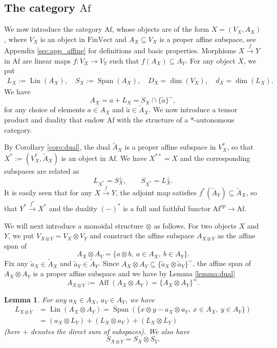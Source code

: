 \documentclass[12pt]{article}
\newtheorem{lemma}{Lemma}
\theoremstyle{definition}
\theoremstyle{remark}
\def\aff{\operatorname{Aff}}
\def\lin{\operatorname{Lin}}
\def\Span{\operatorname{Span}}
\def \Af{\mathrm{Af}}
\def \FV{\mathrm{FinVect}}
\begin{document}
\subsection{The category $\Af$}

We now introduce the category $\Af$, whose objects  are of the form $X=(V_X,A_X)$, where
$V_X$ is an object in $\FV$  and $A_X\subseteq V_X$ is a proper affine subspace, see Appendix
\ref{sec:app_affine} for definitions and basic properties. Morphisms $X\xrightarrow{f} Y$ in $\Af$ are linear maps $f:V_X\to V_Y$  such that
$f(A_X)\subseteq A_Y$. For any object $X$, we put
\begin{align*}
L_X:=\lin(A_X), \quad  S_X:=\Span(A_X), \quad D_X=\dim(V_X),\quad d_X=\dim(L_X).
\end{align*}
We have
\begin{equation}\label{eq:ALS}
A_X=a+L_X=S_X\cap \{\tilde a\}^{\sim},
\end{equation}
for any choice of elements $a\in A_X$ and $\tilde a\in \tilde A_X$.
We now introduce a tensor product  and duality that endow $\Af$ with the structure of a
*-autonomous category.


By Corollary \ref{coro:dual},  the dual $\tilde A_X$ is a proper affine subspace in $V_X^*$, so that
$X^*:=(V_X^*,\tilde A_X)$ is an object in $\Af$. We have $X^{**}=X$ and the corresponding subspaces
are related as
\begin{equation}\label{eq:duality}
L_{X^*}=S_X^\perp,\qquad S_{X^*}=L_X^\perp.
\end{equation}
It is easily seen that for any  $X\xrightarrow{f} Y$, the adjoint map satisfies $f^*(\tilde
A_Y)\subseteq \tilde A_X$, so that $Y^*\xrightarrow{f^*} X^*$ and the duality $(-)^*$ is a
full and faithful functor 
$\Af^{op}\to \Af$.

We will next introduce a monoidal structure $\otimes$ as follows. For two objects $X$ and
$Y$, we put  $V_{X\otimes Y}=V_X\otimes V_Y$ and construct the affine subspace
$A_{X\otimes Y}$ as the affine span of 
\[
A_X\otimes A_Y=\{a\otimes b,\ a\in A_X,\ b\in A_Y\}.
\]
Fix any $\tilde a_X\in \tilde A_X$ and $\tilde a_Y\in \tilde A_Y$. 
Since $A_X\otimes A_Y\subseteq \{\tilde a_X\otimes \tilde a_Y\}^\sim$, the affine span of
$A_X\otimes A_Y$ is a proper affine subspace and we have by Lemma \ref{lemma:dual}
\[
A_{X\otimes Y}:=\aff(A_X\otimes A_Y)=\{A_X\otimes A_Y\}^{\approx}.
\]
\begin{lemma}\label{lemma:tensor_spaces}
For any $a_X\in A_X$, $a_Y\in A_Y$, we  have
\begin{align}
L_{X\otimes Y}&=\lin(A_X\otimes A_Y)=\Span(\{x\otimes y-a_X\otimes a_Y,\ x\in A_X,\ y\in
A_Y\})\label{eq:lxy1}\\
&= (a_X\otimes L_Y)+ (L_X\otimes a_Y)+ (L_X\otimes L_Y)\label{eq:lxy}
\end{align}
(here $+$ denotes the direct sum of subspaces). We also have
\[
S_{X\otimes Y}=S_X\otimes S_Y.
\]
\end{lemma}
\end{document}
